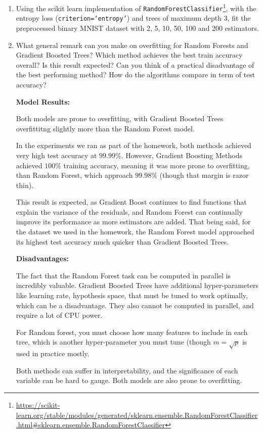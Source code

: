 \documentclass{article}
\theoremstyle{plain}
\theoremstyle{definition}
\begin{document}
\begin{enumerate}
\item Using the scikit learn implementation of \texttt{RandomForestClassifier}\footnote{\url{https://scikit-learn.org/stable/modules/generated/sklearn.ensemble.RandomForestClassifier.html\#sklearn.ensemble.RandomForestClassifier}},
with the entropy loss (\texttt{criterion=`entropy'}) and trees of maximum depth 3, fit the preprocessed binary MNIST dataset with 2, 5, 10, 50, 100 and 200 estimators.\\

\newpage

\item What general remark can you make on overfitting for Random Forests and Gradient Boosted Trees? Which method achieves the best train accuracy overall? Is this result expected? 
Can you think of a practical disadvantage of the best performing method? How do the algorithms compare in term of test accuracy? \\
\subitem

\textbf{Model Results:}

Both models are prone to overfitting, with Gradient Boosted Trees overfittitng slightly more than the Random Forest model. 

In the experiments we ran as part of the homework, both methods achieved very high test accuracy at $99.99\%$. However, Gradient Boosting Methods achieved $100\%$ training accuracy, meaning it was more prone to overfitting, than Random Forest, which approach $99.98\%$ (though that margin is razor thin). 

This result is expected, as Gradient Boost continues to find functions that explain the variance of the residuals, and Random Forest can continually improve its performance as more estimators are added. That being said, for the dataset we used in the homework, the Random Forest model approached its highest test accuracy much quicker than Gradient Boosted Trees. 

\textbf{Disadvantages:}

The fact that the Random Forest task can be computed in parallel is incredibly valuable. Gradient Boosted Trees have additional hyper-parameters like learning rate, hypothesis space, that must be tuned to work optimally, which can be a disadvantage. They also cannot be computed in parallel, and require a lot of CPU power. 

For Random forest, you must choose how many features to include in each tree, which is another hyper-parameter you must tune (though $m=\sqrt{p}$ is used in practice mostly. 

Both methods can suffer in interpretability, and the significance of each variable can be hard to gauge. Both models are also prone to overfitting.


\setcounter{saveenum}{\value{enumi}}
\end{enumerate}
\end{document}
